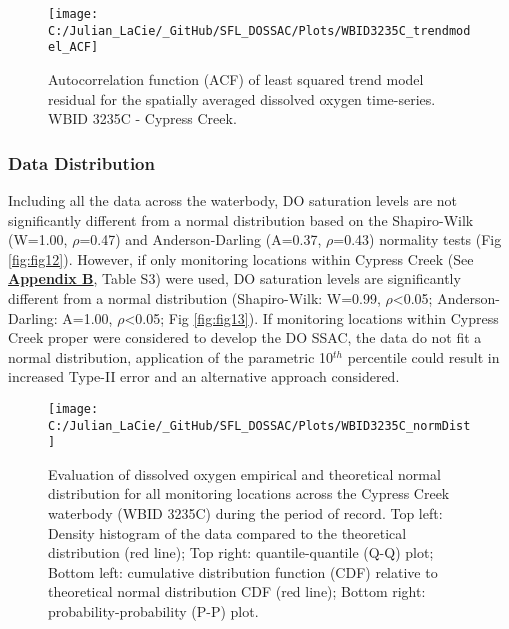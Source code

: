 \documentclass[]{interact}
\theoremstyle{plain}%
\theoremstyle{definition}
\theoremstyle{remark}
\begin{document}
\begin{figure}[H]

{\centering \texttt{[image: C:/Julian\_LaCie/\_GitHub/SFL\_DOSSAC/Plots/WBID3235C\_trendmodel\_ACF]} 

}

\caption{\label{fig:fig11} Autocorrelation function (ACF) of least squared trend model residual for the spatially averaged dissolved oxygen time-series. WBID 3235C - Cypress Creek.}\label{fig:unnamed-chunk-19}
\end{figure}

\hypertarget{data-distribution-2}{%
\subsubsection{Data Distribution}\label{data-distribution-2}}

Including all the data across the waterbody, DO saturation levels are
not significantly different from a normal distribution based on the
Shapiro-Wilk (W=1.00, \(\rho\)=0.47) and Anderson-Darling (A=0.37,
\(\rho\)=0.43) normality tests (Fig \ref{fig:fig12}). However, if only
monitoring locations within Cypress Creek (See
\textbf{\protect\hyperlink{appendix-b}{Appendix B}}, Table S3) were
used, DO saturation levels are significantly different from a normal
distribution (Shapiro-Wilk: W=0.99, \(\rho\)\textless0.05;
Anderson-Darling: A=1.00, \(\rho\)\textless0.05; Fig \ref{fig:fig13}).
If monitoring locations within Cypress Creek proper were considered to
develop the DO SSAC, the data do not fit a normal distribution,
application of the parametric 10\(^{th}\) percentile could result in
increased Type-II error and an alternative approach considered.

\begin{figure}[H]

{\centering \texttt{[image: C:/Julian\_LaCie/\_GitHub/SFL\_DOSSAC/Plots/WBID3235C\_normDist]} 

}

\caption{\label{fig:fig12} Evaluation of dissolved oxygen empirical and theoretical normal distribution for all monitoring locations across the Cypress Creek waterbody (WBID 3235C) during the period of record. Top left: Density histogram of the data compared to the theoretical distribution (red line); Top right: quantile-quantile (Q-Q) plot; Bottom left: cumulative distribution function (CDF) relative to theoretical normal distribution CDF (red line); Bottom right: probability-probability (P-P) plot.}\label{fig:unnamed-chunk-20}
\end{figure}
\end{document}
